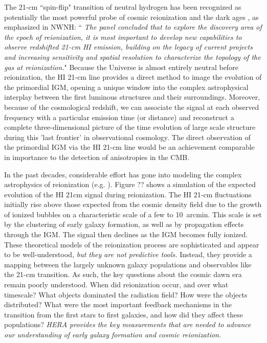\documentclass[preprint]{aastex}
\def\HI{{H{\small I }}}
\begin{document}
The 21-cm ``spin-flip" transition of  neutral hydrogen has been recognized as potentially the most powerful probe 
of cosmic reionization and  the dark ages \citep{morales_wyithe2010, furlanetto_et_al2006}, as emphasized in NWNH: 
``{\it 
The panel concluded that  to explore the discovery area of the epoch of reionization, it is most important to 
develop new capabilities to observe redshifted 21-cm \HI emission, building on the legacy of current projects and 
increasing sensitivity and spatial resolution to characterize the topology of the gas at reionization.}"  Because 
the Universe is almost entirely neutral before reionization, the HI 21-cm line provides a direct method to image 
the evolution of the primordial IGM, opening a unique window into the complex astrophysical interplay between the 
first luminous structures and their surroundings. Moreover, because of the cosmological redshift, we can associate 
the signal at each observed frequency with a particular emission time (or distance) and reconstruct a complete 
three-dimensional picture of the time evolution of large scale structure during this 'last frontier' in 
observational cosmology. 
The direct observation of the primordial IGM via the HI 21-cm line would be an achievement comparable in importance 
to the detection of anisotropies in the CMB.

In the past decades, considerable effort has gone into modeling the complex astrophysics of reionization
(e.g. \citealt{shapiro_giroux1987, haiman_loeb1997, furlanetto_et_al2004, santos_et_al2010}). Figure ?? shows a 
simulation of the expected evolution of the HI 21cm signal during reionization. The HI 21-cm fluctuations initially 
rise above those expected from the cosmic density field due to the growth of ionized bubbles on a characteristic 
scale of a few to 10~arcmin. This scale is set by the clustering of early galaxy formation, as well as by 
propagation effects through the IGM. The signal then declines as the IGM becomes fully ionized.  These theoretical 
models of the reionization process are sophisticated and appear to be well-understood, {\it but they are not 
predictive tools.} Instead, they provide a mapping between the largely unknown galaxy populations and observables 
like the 21-cm transition. As such, the key questions about the cosmic dawn era remain poorly understood.  When 
did reionization occur, and over what timescale?  What objects dominated the radiation field?  How were the 
objects distributed?  What were the most important feedback mechanisms in the transition from the first stars to
first galaxies, and how did they affect these populations?  {\it HERA provides the key measurements that are needed 
to advance our understanding of early galaxy formation and cosmic reionization.}
\end{document}
